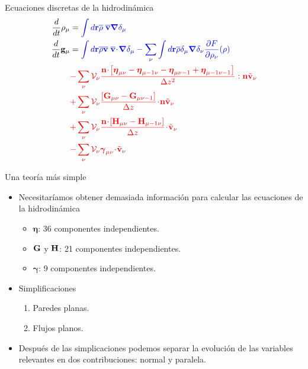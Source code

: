 \documentclass{beamer}
\newcommand{\esc}{\!\cdot\!}
\newcommand{\llg}{\left\lgroup}
\newcommand{\rlg}{\right\rgroup}
\begin{document}
\begin{frame}{Ecuaciones discretas de la hidrodinámica}
\begin{align}
  \frac{d}{dt}\rho_\mu&=  {\color{blue} \int d{\bf r}\overline{\rho} \; \overline{\bf v}\boldsymbol{\nabla}\delta_\mu }
\nonumber\\
\frac{d}{dt}{\bf g}_\mu&=
  {\color{blue} \int d{\bf r}\overline{\rho} \overline{\bf v}\;\overline{\bf v}\esc\boldsymbol{\nabla}\delta_{\mu}
  -\sum_\nu\int d{\bf r}\overline{\rho}\delta_{\mu}\boldsymbol{\nabla}\delta_{\nu}
\frac{\partial  F}{\partial \rho_{\nu}}(\rho)}
\nonumber\\
&{\color{red}-\sum_{\nu}{\cal V}_\nu \frac{{\bf n}\esc\left[\boldsymbol{\eta}_{\mu\nu}-\boldsymbol{\eta}_{\mu-1\nu}-\boldsymbol{\eta}_{\mu\nu-1}+\boldsymbol{\eta}_{\mu-1\nu-1}\right]}{\Delta z^2}:{\bf n}\tilde{\bf v}_\nu}
\nonumber\\
&{\color{red}+\sum_{\nu}{\cal V}_\nu\frac{\left[{\bf G}_{\mu\nu}-{\bf G}_{\mu\nu-1}\right]}{\Delta z}\esc{\bf n}\tilde{\bf v}_\nu}
\nonumber\\
&{\color{red}+\sum_{\nu}{\cal V}_\nu\frac{{\bf n}\esc\left[{\bf H}_{\mu\nu}-{\bf H}_{\mu-1\nu}\right]}{\Delta z}\esc\tilde{\bf v}_\nu}
\nonumber\\
&{\color{red}-\sum_{\nu}{\cal V}_\nu\boldsymbol{\gamma}_{\mu\nu}\esc\tilde{\bf v}_\nu}
\nonumber
\end{align}
\end{frame}

\begin{frame}{Una teoría más simple}
  \begin{itemize}
    \item<1-> Necesitaríamos obtener demasiada información para calcular las ecuaciones de la hidrodinámica 
      \begin{itemize}
        \item $\boldsymbol{\eta}$: 36 componentes independientes.
        \item ${\bf G}$ y ${\bf H}$: 21 componentes independientes. 
        \item $\boldsymbol{\gamma}$: 9 componentes independientes.  
      \end{itemize}
    \item<2-> Simplificaciones 
      \begin{enumerate}
        \item Paredes planas. 
        \item Flujos planos. 
      \end{enumerate}
    \item<3-> Después de las simplicaciones podemos separar la evolución de las variables relevantes en dos contribuciones: normal y paralela. 
    \end{itemize}
\end{frame}
\end{document}
